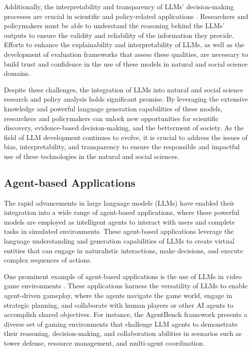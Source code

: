 \documentclass[11pt]{article}
\begin{document}
Additionally, the interpretability and transparency of LLMs' decision-making processes are crucial in scientific and policy-related applications \cite{ref229}. Researchers and policymakers must be able to understand the reasoning behind the LLMs' outputs to ensure the validity and reliability of the information they provide. Efforts to enhance the explainability and interpretability of LLMs, as well as the development of evaluation frameworks that assess these qualities, are necessary to build trust and confidence in the use of these models in natural and social science domains.

Despite these challenges, the integration of LLMs into natural and social science research and policy analysis holds significant promise. By leveraging the extensive knowledge and powerful language generation capabilities of these models, researchers and policymakers can unlock new opportunities for scientific discovery, evidence-based decision-making, and the betterment of society. As the field of LLM development continues to evolve, it is crucial to address the issues of bias, interpretability, and transparency to ensure the responsible and impactful use of these technologies in the natural and social sciences.

\subsection{Agent-based Applications}

The rapid advancements in large language models (LLMs) have enabled their integration into a wide range of agent-based applications, where these powerful models are employed as intelligent agents to interact with users and complete tasks in simulated environments. These agent-based applications leverage the language understanding and generation capabilities of LLMs to create virtual entities that can engage in naturalistic interactions, make decisions, and execute complex sequences of actions.

One prominent example of agent-based applications is the use of LLMs in video game environments \cite{ref230,ref231,ref232}. These applications harness the versatility of LLMs to enable agent-driven gameplay, where the agents navigate the game world, engage in strategic planning, and collaborate with human players or other AI agents to accomplish shared objectives. For instance, the AgentBench \cite{ref230} framework presents a diverse set of gaming environments that challenge LLM agents to demonstrate their reasoning, decision-making, and collaboration abilities in scenarios such as tower defense, resource management, and multi-agent coordination.
\end{document}
